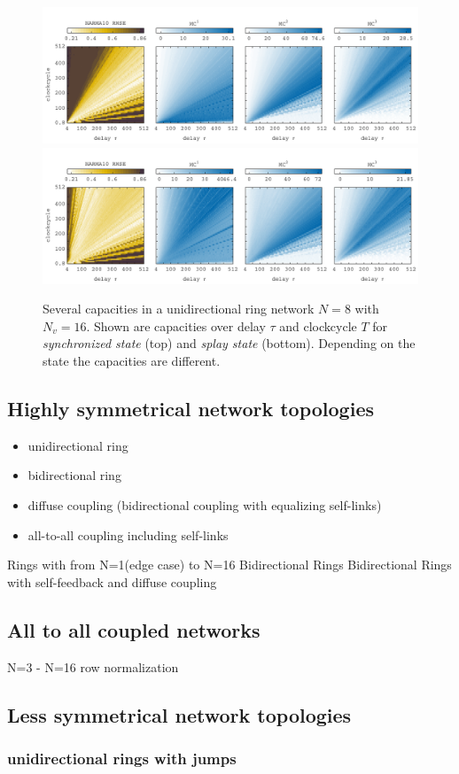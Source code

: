 		\begin{figure}\label{fig:n8_uni_ring_tau_cc_capacities_syncandsplay}
			\centering
			\includegraphics[width=15cm]{pics/n8_narmaplot_sync}
			\includegraphics[width=15cm]{pics/n8_narmaplot_splay}
			\caption{Several capacities in a unidirectional ring network $N=8$ with $N_v=16$. Shown are capacities over delay $\tau$ and clockcycle $T$ for \emph{synchronized state} (top) and \emph{splay state} (bottom). Depending on the state the capacities are different.}	
			\label{fig:n8_uni_ring_tau_cc_capacities_syncstate}

		\end{figure}

	\subsection{Highly symmetrical network topologies}

			\begin{itemize}
				\item unidirectional ring
				\item bidirectional ring
				\item diffuse coupling (bidirectional coupling with equalizing self-links)
				\item all-to-all coupling including self-links
			\end{itemize}

				
	
		
		Rings with from N=1(edge case) to N=16
		Bidirectional Rings
		Bidirectional Rings with self-feedback and diffuse coupling
		
		\subsection{All to all coupled networks}
		N=3 - N=16 row normalization
		
	\subsection{Less symmetrical network topologies}
		\subsubsection{unidirectional rings with jumps}
			
		
